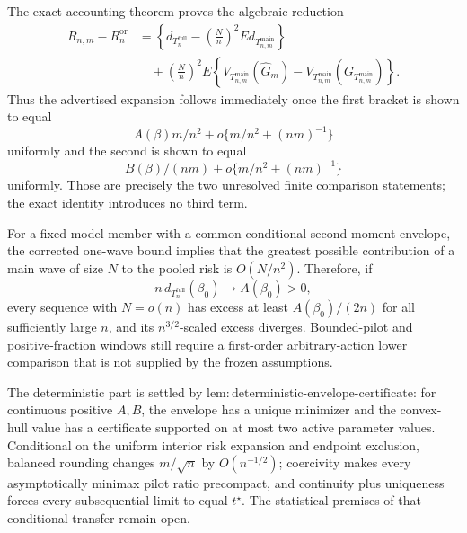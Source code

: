 The exact accounting theorem proves the algebraic reduction
\[
\begin{aligned}
R_{n,m}-R_n^{\mathrm{or}}
&=\left\{d_{T_n^{\mathrm{full}}}
-\left(\frac Nn\right)^2E d_{T_{n,m}^{\mathrm{main}}}\right\}\\
&\quad+\left(\frac Nn\right)^2E\left\{
V_{T_{n,m}^{\mathrm{main}}}(\widehat G_m)
-V_{T_{n,m}^{\mathrm{main}}}(G_{T_{n,m}^{\mathrm{main}}})
\right\}.
\end{aligned}
\]
Thus the advertised expansion follows immediately once the first bracket is shown to equal
\[
A(\beta)m/n^2+o\{m/n^2+(nm)^{-1}\}
\]
uniformly and the second is shown to equal
\[
B(\beta)/(nm)+o\{m/n^2+(nm)^{-1}\}
\]
uniformly.  Those are precisely the two unresolved finite comparison statements; the exact identity introduces no third term.

For a fixed model member with a common conditional second-moment envelope, the corrected one-wave bound implies that the greatest possible contribution of a main wave of size \(N\) to the pooled risk is \(O(N/n^2)\).  Therefore, if
\[
n\,d_{T_n^{\mathrm{full}}}(\beta_0)\to A(\beta_0)>0,
\]
every sequence with \(N=o(n)\) has excess at least \(A(\beta_0)/(2n)\) for all sufficiently large \(n\), and its \(n^{3/2}\)-scaled excess diverges.  Bounded-pilot and positive-fraction windows still require a first-order arbitrary-action lower comparison that is not supplied by the frozen assumptions.

The deterministic part is settled by
\(\mathrm{lem{:}deterministic\text{-}envelope\text{-}certificate}\): for continuous positive \(A,B\), the envelope has a unique minimizer and the convex-hull value has a certificate supported on at most two active parameter values.  Conditional on the uniform interior risk expansion and endpoint exclusion, balanced rounding changes \(m/\sqrt n\) by \(O(n^{-1/2})\); coercivity makes every asymptotically minimax pilot ratio precompact, and continuity plus uniqueness forces every subsequential limit to equal \(t^\star\).  The statistical premises of that conditional transfer remain open.

